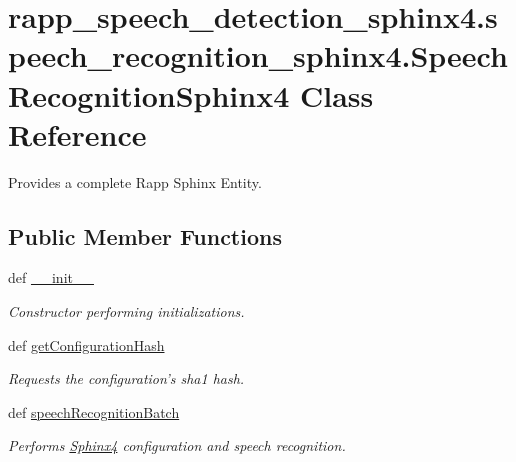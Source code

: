 \hypertarget{classrapp__speech__detection__sphinx4_1_1speech__recognition__sphinx4_1_1SpeechRecognitionSphinx4}{\section{rapp\-\_\-speech\-\_\-detection\-\_\-sphinx4.\-speech\-\_\-recognition\-\_\-sphinx4.\-Speech\-Recognition\-Sphinx4 Class Reference}
\label{classrapp__speech__detection__sphinx4_1_1speech__recognition__sphinx4_1_1SpeechRecognitionSphinx4}
}


Provides a complete Rapp Sphinx Entity.  


\subsection*{Public Member Functions}
\begin{DoxyCompactItemize}
\item 
def \hyperlink{classrapp__speech__detection__sphinx4_1_1speech__recognition__sphinx4_1_1SpeechRecognitionSphinx4_a43476824e9fc3fe7671164796b1332eb}{\-\_\-\-\_\-init\-\_\-\-\_\-}
\begin{DoxyCompactList}\small\item\em Constructor performing initializations. \end{DoxyCompactList}\item 
def \hyperlink{classrapp__speech__detection__sphinx4_1_1speech__recognition__sphinx4_1_1SpeechRecognitionSphinx4_a547725db1410fdb7ba782387d8ca2507}{get\-Configuration\-Hash}
\begin{DoxyCompactList}\small\item\em Requests the configuration's sha1 hash. \end{DoxyCompactList}\item 
def \hyperlink{classrapp__speech__detection__sphinx4_1_1speech__recognition__sphinx4_1_1SpeechRecognitionSphinx4_a60e2286679d5dce9da486c7b6c3b5ad3}{speech\-Recognition\-Batch}
\begin{DoxyCompactList}\small\item\em Performs \hyperlink{classSphinx4}{Sphinx4} configuration and speech recognition. \end{DoxyCompactList}\end{DoxyCompactItemize}
